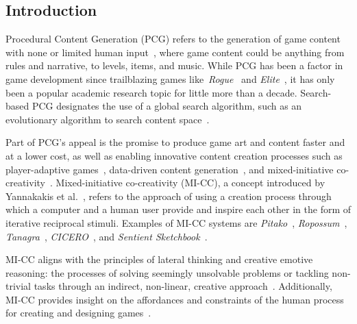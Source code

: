 \subsection{Introduction}


Procedural Content Generation (PCG) refers to the generation of game content with none or limited human input~\cite{p6Yannakakis2018}, where game content could be anything from rules and narrative, to levels, items, and music. While PCG has been a factor in game development since trailblazing games like~\emph{Rogue}~\cite{p6michael_toy_1980} and \emph{Elite}~\cite{p6braben_elite_1984}, it has only been a popular academic research topic for little more than a decade. Search-based PCG designates the use of a global search algorithm, such as an evolutionary algorithm to search content space~\cite{p6Togelius2011}.

Part of PCG's appeal is the promise to produce game art and content faster and at a lower cost, as well as enabling innovative content creation processes such as player-adaptive games~\cite{p6shaker2012evolving, hastings_evolving_2009, dormansUnexplored2017}, data-driven content generation~\cite{p6Khalifa2018, Green2018}, and mixed-initiative co-creativity~\cite{p6Liapis2016}. Mixed-initiative co-creativity (MI-CC), a concept introduced by Yannakakis et al.~\cite{p6yannakakis2014micc}, refers to the approach of using a creation process through which a computer and a human user provide %
and inspire each other in the form of iterative reciprocal stimuli. Examples of MI-CC systems are \textit{Pitako}~\cite{p6machado2019pitako}, \textit{Ropossum}~\cite{p6shaker2013ropossum}, \textit{Tanagra}~\cite{p6smith_tanagra:_2011}, \textit{CICERO}~\cite{p6Machado2017}, and \textit{Sentient Sketchbook}~\cite{p6liapis_generating_2013}. 

MI-CC aligns with the principles of lateral thinking and creative emotive reasoning: the processes of solving seemingly unsolvable problems or tackling non-trivial tasks through an indirect, non-linear, creative approach~\cite{p6Liapis2016}. Additionally, MI-CC provides insight on the affordances and constraints of the human process for creating and designing games~\cite{p6Yannakakis2018}.

